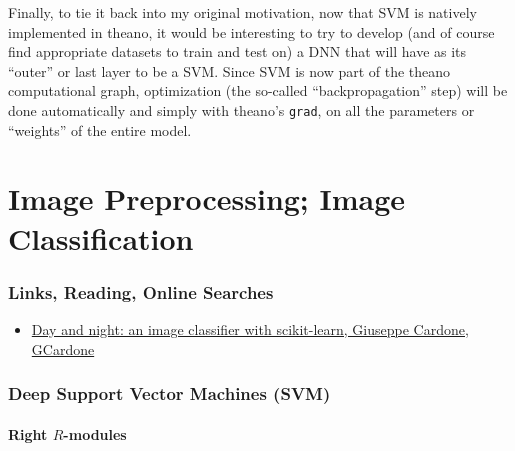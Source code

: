 \documentclass[10pt]{amsart}
\begin{document}
\begin{multicols*}{2}
Finally, to tie it back into my original motivation, now that SVM is natively implemented in theano, it would be interesting to try to develop (and of course find appropriate datasets to train and test on) a DNN that will have as its ``outer'' or last layer to be a SVM.  Since SVM is now part of the theano computational graph, optimization (the so-called ``backpropagation'' step) will be done automatically and simply with theano's \verb|grad|, on all the parameters or ``weights'' of the entire model.  

\part{Image Preprocessing; Image Classification}

\section{Links, Reading, Online Searches}

\begin{itemize}
\item \href{http://www.ippatsuman.com/2014/08/13/day-and-night-an-image-classifier-with-scikit-learn/}{Day and night: an image classifier with scikit-learn, Giuseppe Cardone, GCardone}
  \end{itemize}



\section{Deep Support Vector Machines (SVM)}

\subsection{Right $R$-modules}


\end{multicols*}
\end{document}
